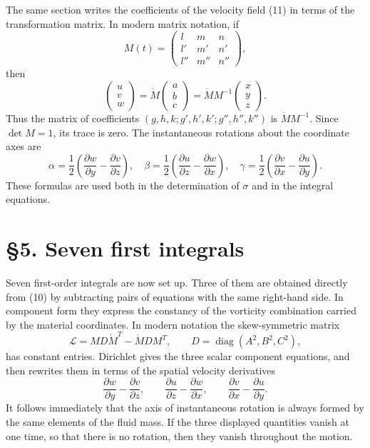 \documentclass[11pt]{article}
\newcommand{\pder}[2]{\frac{\partial #1}{\partial #2}}
\begin{document}
The same section writes the coefficients of the velocity field (11) in terms of the transformation matrix.  In modern matrix notation, if
\[
 M(t)=\begin{pmatrix}l&m&n\\l'&m'&n'\\l''&m''&n''\end{pmatrix},
\]
then
\[
 \begin{pmatrix}u\\v\\w\end{pmatrix}=\dot M\begin{pmatrix}a\\b\\c\end{pmatrix}
 =\dot M M^{-1}\begin{pmatrix}x\\y\\z\end{pmatrix}.
\]
Thus the matrix of coefficients \((g,h,k;g',h',k';g'',h'',k'')\) is \(\dot M M^{-1}\).  Since \(\det M=1\), its trace is zero.  The instantaneous rotations about the coordinate axes are
\[
 \alpha=\frac12\left(\pder{w}{y}-\pder{v}{z}\right),\quad
 \beta=\frac12\left(\pder{u}{z}-\pder{w}{x}\right),\quad
 \gamma=\frac12\left(\pder{v}{x}-\pder{u}{y}\right).
\]
These formulas are used both in the determination of \(\sigma\) and in the integral equations.

\section*{\S5. Seven first integrals}

Seven first-order integrals are now set up.  Three of them are obtained directly from (10) by subtracting pairs of equations with the same right-hand side.  In component form they express the constancy of the vorticity combination carried by the material coordinates.  In modern notation the skew-symmetric matrix
\begin{equation}
 \mathcal L=M D\dot M^T-\dot M D M^T,
 \qquad D=\operatorname{diag}(A^2,B^2,C^2),
\end{equation}
has constant entries.  Dirichlet gives the three scalar component equations, and then rewrites them in terms of the spatial velocity derivatives
\[
 \pder{w}{y}-\pder{v}{z},\qquad
 \pder{u}{z}-\pder{w}{x},\qquad
 \pder{v}{x}-\pder{u}{y}.
\]
It follows immediately that the axis of instantaneous rotation is always formed by the same elements of the fluid mass.  If the three displayed quantities vanish at one time, so that there is no rotation, then they vanish throughout the motion.
\end{document}
